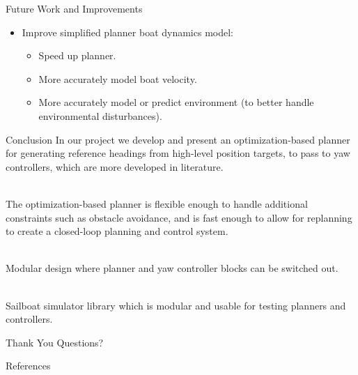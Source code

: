 \documentclass[10pt,xcolor={table,dvipsnames},t]{beamer}
\begin{document}
\begin{frame}{Future Work and Improvements}

\begin{itemize}
    \item Improve simplified planner boat dynamics model:
    \begin{itemize}
        \item Speed up planner.
        \item More accurately model boat velocity.
        \item More accurately model or predict environment (to better handle environmental disturbances).
    \end{itemize}
\end{itemize}
    
\end{frame}

\begin{frame}{Conclusion}
    In our project we develop and present an optimization-based planner for generating
    reference headings from high-level position targets, to pass to yaw controllers, which are more developed in literature.
    
    \hfill\\
    The optimization-based planner is flexible enough to handle additional constraints such as  obstacle avoidance, and is fast enough to allow for replanning to create a closed-loop planning and control system.
    
    \hfill\\
    Modular design where planner and yaw controller blocks can be switched out.
    
    \hfill\\
    Sailboat simulator library which is modular and usable for testing planners and controllers.
\end{frame}

\begin{frame}{Thank You}
    Questions?
\end{frame}


\begin{frame}{References}
    \printbibliography{}
\end{frame}
\end{document}
